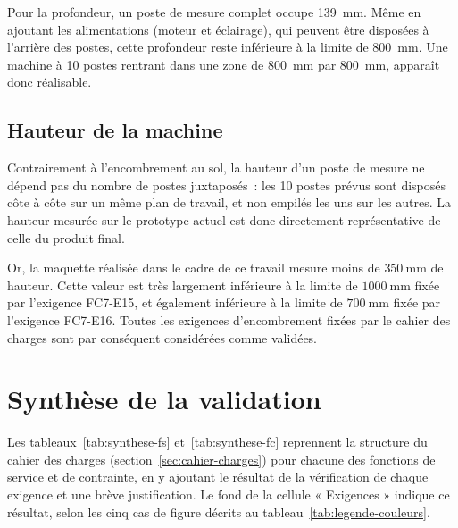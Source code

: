 Pour la profondeur, un poste de mesure complet occupe 139~mm. Même en ajoutant les
alimentations (moteur et éclairage), qui peuvent être disposées à l'arrière des postes, cette profondeur reste inférieure à la limite de 800~mm.
Une machine à 10 postes rentrant dans une zone de 800~mm par 800~mm, apparaît donc
réalisable.

\subsection{Hauteur de la machine}

Contrairement à l'encombrement au sol, la hauteur d'un poste de mesure ne
dépend pas du nombre de postes juxtaposés~: les 10 postes prévus sont disposés
côte à côte sur un même plan de travail, et non empilés les uns sur les
autres. La hauteur mesurée sur le prototype actuel est donc directement
représentative de celle du produit final.

Or, la maquette réalisée dans le cadre de ce travail mesure moins de
$350\ \mathrm{mm}$ de hauteur. Cette valeur est très largement inférieure à la
limite de $1000\ \mathrm{mm}$ fixée par l'exigence FC7-E15, et également
inférieure à la limite de $700\ \mathrm{mm}$ fixée par l'exigence FC7-E16. 
Toutes les exigences d'encombrement fixées par le cahier des charges sont par conséquent considérées comme validées.


\section{Synthèse de la validation}
\label{sec:valid-synthese}

Les tableaux~\ref{tab:synthese-fs} et~\ref{tab:synthese-fc} reprennent la
structure du cahier des charges (section~\ref{sec:cahier-charges}) pour
chacune des fonctions de service et de contrainte, en y ajoutant le résultat
de la vérification de chaque exigence et une brève justification. Le fond de
la cellule « Exigences » indique ce résultat, selon les cinq cas de figure
décrits au tableau~\ref{tab:legende-couleurs}.

